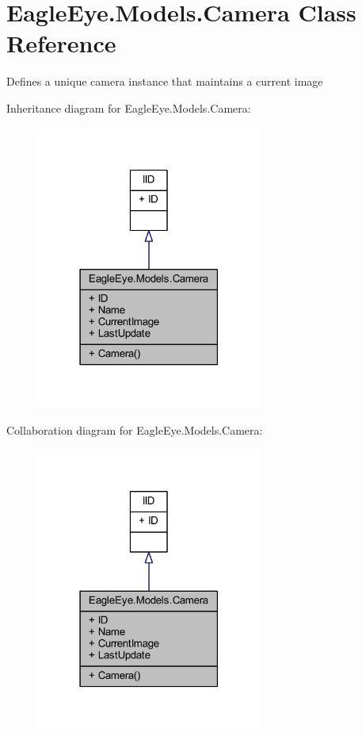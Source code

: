 \hypertarget{class_eagle_eye_1_1_models_1_1_camera}{}\section{Eagle\+Eye.\+Models.\+Camera Class Reference}
\label{class_eagle_eye_1_1_models_1_1_camera}


Defines a unique camera instance that maintains a current image  




Inheritance diagram for Eagle\+Eye.\+Models.\+Camera\+:\nopagebreak
\begin{figure}[H]
\begin{center}
\leavevmode
\includegraphics[width=210pt]{class_eagle_eye_1_1_models_1_1_camera__inherit__graph}
\end{center}
\end{figure}


Collaboration diagram for Eagle\+Eye.\+Models.\+Camera\+:\nopagebreak
\begin{figure}[H]
\begin{center}
\leavevmode
\includegraphics[width=210pt]{class_eagle_eye_1_1_models_1_1_camera__coll__graph}
\end{center}
\end{figure}
